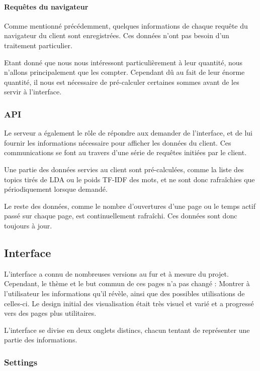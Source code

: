 			\paragraph{Requêtes du navigateur}

				Comme mentionné précédemment, quelques informations de chaque requête du navigateur du client sont enregistrées. Ces données n'ont pas besoin d'un traitement particulier.

				Etant donné que nous nous intéressont particulièrement à leur quantité, nous n'allons principalement que les compter. Cependant dû au fait de leur énorme quantité, il nous est nécessaire de pré-calculer certaines sommes avant de les servir à l'interface.

		\subsubsection{API}

			Le serveur a également le rôle de répondre aux demander de l'interface, et de lui fournir les informations nécessaire pour afficher les données du client. Ces communications se font au travers d'une série de requêtes initiées par le client.

			Une partie des données servies au client sont pré-calculées, comme la liste des topics tirés de LDA ou le poids TF-IDF des mots, et ne sont donc rafraîchies que périodiquement lorsque demandé.

			Le reste des données, comme le nombre d'ouvertures d'une page ou le temps actif passé sur chaque page, est continuellement rafraîchi. Ces données sont donc toujours à jour.

	\subsection{Interface}

		L'interface a connu de nombreuses versions au fur et à mesure du projet. Cependant, le thème et le but commun de ces pages n'a pas changé : Montrer à l'utilisateur les informations qu'il révèle, ainsi que des possibles utilisations de celles-ci. Le design initial des visualisation était très visuel et varié et a progressé vers des pages plus utilitaires.

		L'interface se divise en deux onglets distincs, chacun tentant de représenter une partie des informations. 

		\subsubsection{Settings}


